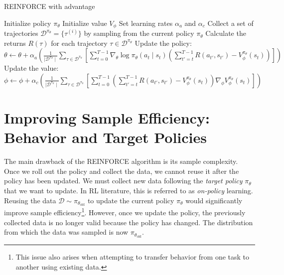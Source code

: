 \begin{algorithm}
    \caption{REINFORCE with advantage}
    \begin{algorithmic}
    \STATE Initialize policy $\pi_{\theta}$
    \STATE Initialize value $V_{\phi}$
    \STATE Set learning rates $\alpha_{a}$ and $\alpha_{c}$
        \STATE Collect a set of trajectories $\mathcal{D}^{\pi_{\theta}}=\{\tau^{(i)}\}$ by sampling from the current policy $\pi_{\theta}$
        \STATE Calculate the returns $R(\tau)$ for each trajectory $\tau\in\mathcal{D}^{\pi_{\theta}}$
        \STATE Update the policy:
        \STATE \qquad$\theta \leftarrow \theta + \alpha_{a} \left(\frac{1}{\mid\mathcal{D^{\pi_{\theta}}}\mid}\sum_{\tau\in\mathcal{D}^{\pi_{\theta}}}\left[\sum_{t=0}^{T-1}\nabla_{\theta}\log\pi_{\theta}(a_{t}\mid s_{t})\left(\sum_{t'=t}^{T-1} R(a_{t'}, s_{t'}) - V_{\phi}^{\pi_{\theta}}(s_{t})\right)\right]\right)$
        \STATE Update the value:
        \STATE \qquad $\phi \leftarrow \phi + \alpha_{c} \left(\frac{1}{\mid\mathcal{D}^{\pi_{\theta}}\mid}\sum_{\tau\in\mathcal{D}^{\pi_{\theta}}}\left[\sum_{t=0}^{T-1}\left(\sum_{t'=t}^{T-1} R(a_{t'}, s_{t'}) - V_{\phi}^{\pi_{\theta}}(s_{t})\right)\nabla_{\phi}V_{\phi}^{\pi_{\theta}}(s_{t})\right]\right)$
    \ENDFOR
    \end{algorithmic}
\end{algorithm}



\section{Improving Sample Efficiency: Behavior and Target Policies}


The main drawback of the REINFORCE algorithm is its sample complexity. Once we roll out the policy and collect the data, we cannot reuse it after the policy has been updated. We must collect new data following the \textit{target policy} $\pi_{\theta}$ that we want to update. In RL literature, this is referred to as \textit{on-policy} learning. Reusing the data $\mathcal{D}\sim\pi_{\theta_{\text{old}}}$ to update the current policy $\pi_{\theta}$ would significantly improve sample efficiency\footnote{This issue also arises when attempting to transfer behavior from one task to another using existing data.}. However, once we update the policy, the previously collected data is no longer valid because the policy has changed. The distribution from which the data was sampled is now $\pi_{\theta_{\text{old}}}$. \\

